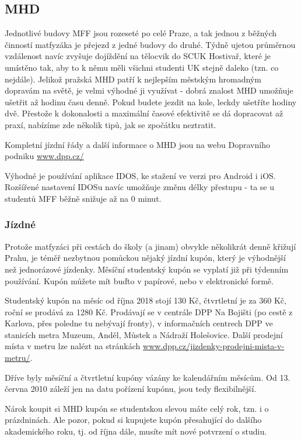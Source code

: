 \subsection{MHD}
Jednotlivé budovy MFF jsou rozeseté po celé Praze, a tak jednou z běžných
činností matfyzáka je přejezd z jedné budovy do druhé. Týdně ujetou průměrnou
vzdálenost navíc zvyšuje dojíždění na tělocvik do SCUK Hostivař, které je
umístěno tak, aby to k němu měli všichni studenti UK stejně daleko (tzn. co
nejdále). Jelikož pražská MHD patří k nejlepším městským hromadným dopravám na
světě, je velmi výhodné ji využívat - dobrá znalost MHD umožňuje ušetřit až
hodinu času denně. Pokud budete jezdit na kole, leckdy ušetříte hodiny dvě.
Přestože k dokonalosti a maximální časové efektivitě se dá dopracovat až praxí,
nabízíme zde několik tipů, jak se zpočátku neztratit.

Kompletní jízdní řády a další informace o MHD jsou na webu Dopravního podniku
\url{www.dpp.cz/}

Výhodné je používání aplikace IDOS, ke stažení ve verzi pro Android i iOS.
Rozšířené nastavení IDOSu navíc umožňuje změnu délky přestupu - ta se u studentů
MFF běžně snižuje až na 0 minut.


\subsubsection{Jízdné}
Protože matfyzáci při cestách do školy (a jinam) obvykle několikrát denně
křižují Prahu, je téměř nezbytnou pomůckou nějaký jízdní kupón, který je
výhodnější než jednorázové jízdenky. Měsíční studentský kupón se vyplatí již při
týdenním používání. Kupón můžete mít buďto v papírové, nebo v elektronické
formě.

Studentský kupón na měsíc od října 2018 stojí 130 Kč, čtvrtletní je za 360 Kč,
roční se prodává za 1280 Kč. Prodávají se v centrále DPP Na Bojišti (po cestě z
Karlova, přes poledne tu nebývají fronty), v informačních centrech DPP ve
stanicích metra Muzeum, Anděl, Můstek a Nádraží Holešovice. Další prodejní místa
v metru lze nalézt na stránkách
\url{www.dpp.cz/jizdenky-prodejni-mista-v-metru/}.

Dříve byly měsíční a čtvrtletní kupóny vázány ke kalendářním měsícům. Od 13.
června 2010 záleží jen na datu pořízení kupónu, jsou tedy flexibilnější.

Nárok koupit si MHD kupón se studentskou slevou máte celý rok, tzn. i o
prázdninách. Ale pozor, pokud si kupujete kupón přesahující do dalšího
akademického roku, tj. od října dále, musíte mít nové potvrzení o studiu.

